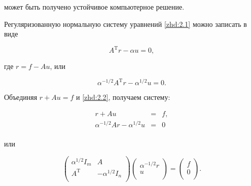 может быть получено устойчивое компьютерное решение.



Регуляризованную нормальную систему уравнений \eqref{zhd:2.1} можно записать в виде

$$ A^\mathrm{T}r-\alpha u=0, $$

где $r=f-Au$, или

\begin{equation}\label{zhd:2.2}

    \alpha^{-1/2}A^\mathrm{T}r-\alpha^{1/2}u=0.

\end{equation}

Объединяя $r+Au=f$ и \eqref{zhd:2.2}, получаем систему:

$$

\begin{array}{ccc}

  r+Au & = & f, \\

  \alpha^{-1/2}Ar-\alpha^{1/2}u & = & 0 \\

\end{array}

$$

или

\begin{equation}\label{zhd:2.3}

    \left(

  \begin{array}{cc}

    \alpha^{1/2}I_m & A \\

    A^\mathrm{T} & -\alpha^{1/2}I_n \\

  \end{array}

\right)

\left(

  \begin{array}{c}

    \alpha^{-1/2}r \\

    u \\

  \end{array}

\right)=\left(

          \begin{array}{c}

            f \\

            0 \\

          \end{array}

        \right).

\end{equation}

